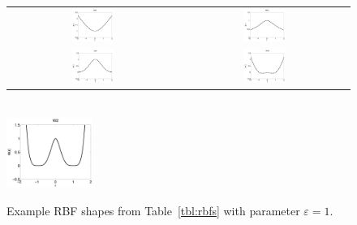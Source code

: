 \begin{figure}[t]
\centering
\begin{tabular}{cc}
\includegraphics[width=0.25\textwidth]{matlab/mq_rbf.pdf} & \includegraphics[width=0.25\textwidth]{matlab/imq_rbf.pdf} \\
\includegraphics[width=0.25\textwidth]{matlab/ga_rbf.pdf} & \includegraphics[width=0.25\textwidth]{matlab/tps_rbf.pdf} \\
\end{tabular} \\
\includegraphics[width=0.25\textwidth]{matlab/w2_rbf.pdf}
\caption{Example RBF shapes from Table~\ref{tbl:rbfs} with parameter $\varepsilon=1$.}
\label{fig:rbf_examples}
\end{figure} 
